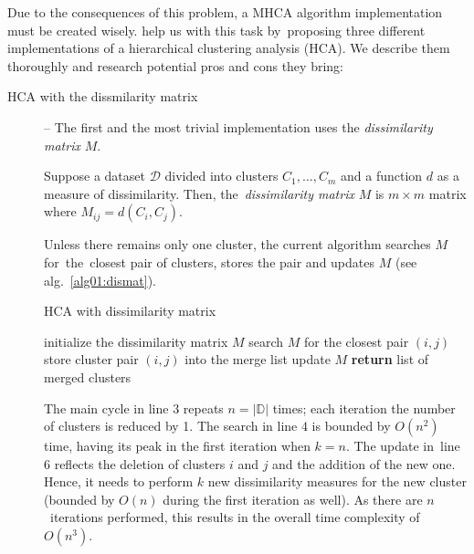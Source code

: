 Due to the consequences of this problem, a MHCA algorithm implementation must be created wisely. \citet{day1984efficient} help us with this task by~proposing three different implementations of a hierarchical clustering analysis (HCA). We describe them thoroughly and research potential pros and cons they bring:

\begin{description}
	\item[HCA with the dissmilarity matrix] -- The first and the most trivial implementation uses the \emph{dissimilarity matrix} $M$.
	
	\begin{defn}
		Suppose a dataset $\mathcal{D}$ divided into clusters $C_1,\dots,C_m$ and a function $d$ as a measure of dissimilarity. Then, the~\emph{dissimilarity matrix} $M$ is $m\times m$ matrix where $M_{ij} = d(C_i,C_j)$.
		\label{def01:dismat}
	\end{defn}

 Unless there remains only one cluster, the current algorithm searches $M$ for~the~closest pair of clusters, stores the pair and updates $M$ (see alg.~\ref{alg01:dismat}).
	
	\begin{algorithm}
		\caption{HCA with dissimilarity matrix}
		\label{alg01:dismat}
		\begin{algorithmic}[1]
			\State initialize the dissimilarity matrix $M$
			\State search $M$ for the closest pair $(i,j)$ 
			\State store cluster pair $(i,j)$ into the merge list 
			\State update $M$ 
			\EndFor
			\State \textbf{return} list of merged clusters
			\EndProcedure
		\end{algorithmic}
	\end{algorithm}

	The main cycle in line $3$ repeats $n = |\mathbb{D}|$ times; each iteration the number of clusters is reduced by 1. The search in line $4$ is bounded by $O(n^2)$ time, having its peak in the first iteration when $k=n$. The update in~line~$6$ reflects the deletion of clusters $i$ and $j$ and the addition of the new one. Hence, it needs to perform $k$ new dissimilarity measures for the new cluster (bounded by $O(n)$ during the first iteration as well). As there are $n$~iterations performed, this results in the overall time complexity of $O(n^3)$. 
	

\end{description}
